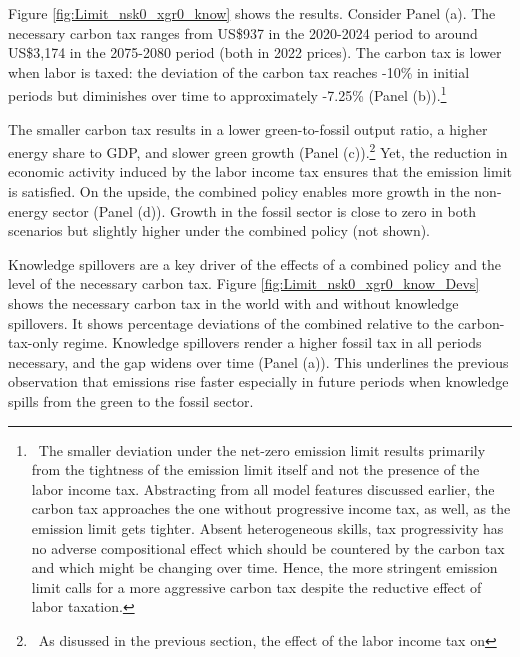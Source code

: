\begin{figure}[h!!]
\begin{subfigure}[]{0.4\textwidth}
\end{subfigure}					
 \end{figure} 
 
 
Figure \ref{fig:Limit_nsk0_xgr0_know} shows the results.
Consider Panel (a). The necessary carbon tax ranges from US\$937  in the 2020-2024 period to around US\$3,174 in the 2075-2080 period (both in 2022 prices). The carbon tax is lower when labor is taxed: the deviation of the carbon tax reaches -10\% in initial periods but diminishes over time to approximately -7.25\% (Panel (b)).\footnote{\ The smaller deviation under the net-zero emission limit results primarily from the tightness of the emission limit itself and not the presence of the labor income tax. Abstracting from all model features discussed earlier, the carbon tax approaches the one without progressive income tax, as well, as the emission limit gets tighter. Absent heterogeneous skills, tax progressivity has no adverse compositional effect which should be countered by the carbon tax and which might be changing over time. Hence, the more stringent emission limit calls for a more aggressive carbon tax despite the reductive effect of labor taxation.}

The smaller carbon tax results in a lower green-to-fossil output ratio, a higher energy share to GDP, and slower green growth (Panel (c)).\footnote{\ As disussed in the previous section, the effect of the labor income tax on } Yet, the reduction in economic activity induced by the labor income tax ensures that the emission limit is satisfied. On the upside, the combined policy enables more growth in the non-energy sector (Panel (d)). Growth in the fossil sector is close to zero in both scenarios but slightly higher under the combined policy (not shown).  

Knowledge spillovers are a key driver of the effects of a combined policy and the level of the necessary carbon tax. Figure \ref{fig:Limit_nsk0_xgr0_know_Devs} shows the necessary carbon tax in the world with and without knowledge spillovers. It shows percentage deviations of the combined relative to the carbon-tax-only regime.
Knowledge spillovers render a higher fossil tax in all periods necessary, and the gap widens over time (Panel (a)).
This underlines the previous observation that emissions rise faster especially in future periods when knowledge spills from the green to the fossil sector. 
 
